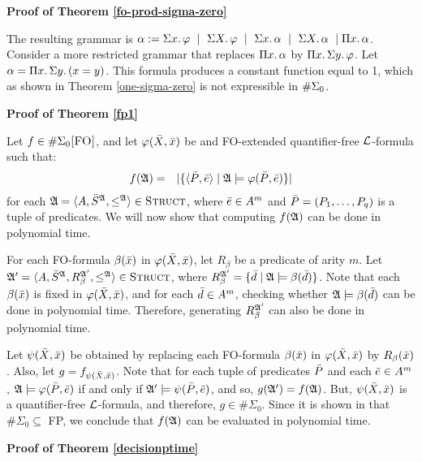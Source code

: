 \textbf{Proof of Theorem \ref{fo-prod-sigma-zero}}

The resulting grammar is $\alpha := \sa{x}\varphi \ \mid \ \sa{X} \varphi \ \mid \ \sa{x}\alpha \ \mid \ \sa{X}\alpha \ \mid \pa{x}\alpha$. Consider a more restricted grammar that replaces $\pa{x}\alpha$ by $\pa{x}\sa{y}\varphi$. Let $\alpha = \pa{x}\sa{y}(x = y)$. This formula produces a constant function equal to 1, which as shown in Theorem \ref{one-sigma-zero} is not expressible in $\E{0}$. 

\textbf{Proof of Theorem \ref{fp1}}

Let $f \in \XE{0}$, and let $\varphi(\X,\x)$ be and {\sc FO}-extended quantifier-free $\L$-formula such that:
\begin{eqnarray*}
	f(\A) &=& \vert \{\langle \P,\e  \rangle \mid \A \models \varphi(\P,\e) \} \vert
\end{eqnarray*}
for each $\A = \langle A, \S^{\A}, \leq^{\A} \rangle \in \str$, where $\e \in A^m$ and $\P = (P_1,\ldots,P_q)$ is a tuple of predicates. We will now show that computing $f(\A)$ can be done in polynomial time.

For each {\sc FO}-formula $\beta(\x)$ in $\varphi(\X,\x)$, let $R_{\beta}$ be a predicate of arity $m$. Let $\A^\prime = \langle A, \S^{\A}, R_{\beta}^{\A^\prime}, \leq^{\A} \rangle \in \str$, where $R_{\beta}^{\A^\prime} = \{\d \mid \A \models \beta(\d)\}$. Note that each $\beta(\x)$ is fixed in $\varphi(\X,\x)$, and for each $\d \in A^m$, checking whether $\A \models \beta(\d)$ can be done in polynomial time. Therefore, generating $R_{\beta}^{\A^\prime}$ can also be done in polynomial time.

Let $\psi(\X,\x)$ be obtained by replacing each {\sc FO}-formula $\beta(\x)$ in $\varphi(\X,\x)$ by $R_{\beta}(\x)$. Also, let $g = f_{\psi(\X,\x)}$. Note that for each tuple of predicates $\P$ and each $\e \in A^m$, $\A \models \varphi(\P,\e)$ if and only if $\A^\prime \models \psi(\P,\e)$, and so, $g(\A^\prime) = f(\A)$. But, $\psi(\X,\x)$ is a quantifier-free $\L$-formula, and therefore, $g \in \#\Sigma_0$. Since it is shown in \cite{DBLP:journals/jcss/SalujaST95} that $\#\Sigma_0 \subseteq$ {\sc FP}, we conclude that $f(\A)$ can be evaluated in polynomial time.
	
\textbf{Proof of Theorem \ref{decisionptime}}

